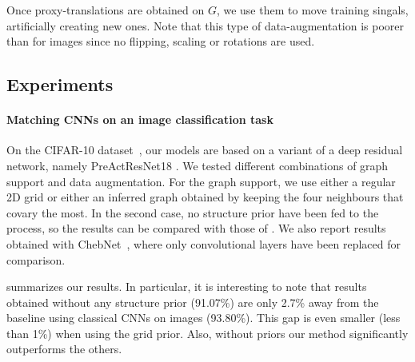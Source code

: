 Once proxy-translations are obtained on $G$, we use them to move training singals, artificially creating new ones. Note that this type of data-augmentation is poorer than for images since no flipping, scaling or rotations are used.

\subsection{Experiments}
\paragraph{Matching CNNs on an image classification task}

On the CIFAR-10 dataset~\citep{krizhevsky2009learning}, our models are based on a variant of a deep residual network, namely PreActResNet18 \citep{he2016identity}. We tested different combinations of graph support and data augmentation. For the graph support, we use either a regular 2D grid or either an inferred graph obtained by keeping the four neighbours that covary the most. In the second case, no structure prior have been fed to the process, so the results can be compared with those of \cite{lin2015}. We also report results obtained with ChebNet~\citep{defferrard2016convolutional}, where only convolutional layers have been replaced for comparison.

 summarizes our results. In particular, it is interesting to note that results obtained without any structure prior (91.07\%) are only 2.7\% away from the baseline using classical CNNs on images (93.80\%). This gap is even smaller (less than 1\%) when using the grid prior. Also, without priors our method significantly outperforms the others. %

